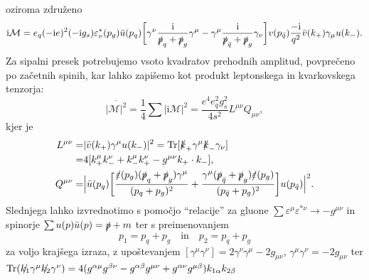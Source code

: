 \documentclass[11pt]{article}
\newcommand{\Tr}{\mathop{\rm Tr}\nolimits}
\newcommand{\ii}{\mathrm{i}}
\newcommand{\q}[1]{``#1''}
\begin{document}
oziroma združeno
\begin{equation}
       \ii \mathcal{M} = e_q (-\ii e)^2 (-\ii g_s )\varepsilon^*_\nu (p_g)
       \bar{u}(p_q)
       \bigg[ \gamma ^\nu \frac{\ii}{\slashed{p}_q + \slashed{p}_g} \gamma^\mu - 
       \gamma^\mu \frac{\ii}{\slashed{p}_{\bar{q}} + \slashed{p}_g} \gamma_\nu \bigg]
       v(p_{\bar{q}}) \frac{-\ii}{q^2} \bar{v}(k_+) \gamma_\mu u(k_-).
\end{equation}
Za sipalni presek potrebujemo vsoto kvadratov prehodnih amplitud, povprečeno po začetnih spinih, kar lahko zapišemo kot
produkt leptonskega in kvarkovskega tenzorja:
\begin{equation}
       \overline{| \mathcal{M} |^2} = \frac{1}{4} \sum | \ii \mathcal{M}|^2 = 
       \frac{e^4 e_q^2 g_s^2}{4 s^2} L^{\mu \nu} Q_{\mu \nu},
\end{equation}
kjer je
\begin{equation}
       \begin{split}
              L^{\mu \nu} =& | \bar{v}(k_+) \gamma^\mu u(k_-) |^2 = \Tr [\slashed{k}_+ \gamma^\mu \slashed{k}_- \gamma_\nu] \\
              =& 4 [k_+^\mu k_-^\nu + k_-^\mu k_+^\nu - g^{\mu \nu}k_+ \cdot k_-], \\
              Q^{\mu \nu} =& \Big | \bar{u}(p_q) \bigg [ 
                     \frac{\slashed{\varepsilon} (p_g) (\slashed{p}_{q} + \slashed{p}_g) \gamma^\mu}{(p_{q} + p_g)^2} + 
                     \frac{\gamma^\mu (\slashed{p}_{\bar{q}} + \slashed{p}_g) \slashed{\varepsilon} (p_g)}{(p_{\bar{q}} + p_g)^2}
              \bigg ] u(p_{\bar{q}}) \Big |^2.
       \end{split}
\end{equation}
Slednjega lahko izvrednotimo s pomočjo \q{relacije} za gluone $\sum \varepsilon^\mu \varepsilon^{* \nu} \rightarrow -g^{\mu \nu}$
in spinorje $\sum u(p) \bar{u}(p) = \slashed{p} + m$ ter s preimenovanjem
\begin{equation}
       p_1 = p_q + p_g \quad \text{in} \quad p_2 = p_{\bar{q}} + p_g
\end{equation}
za voljo krajšega izraza, z upoštevanjem
$[\gamma^\mu \gamma^\nu] = 2 \gamma^\nu \gamma^\mu - 2 g_{\mu \nu}$, \hspace*{5mm}  
 ${\gamma^\mu \gamma^\nu} = - 2 g_{\mu \nu}$ ter \newline
 $ \text{Tr}(\slashed{k_1} \gamma^\mu \slashed{k_2} \gamma^\nu) = 
 4(g^{\alpha\mu} g^{\beta\nu} - g^{\alpha\beta} g^{\mu\nu} + 
 g^{\alpha\nu} g^{\mu\beta}) k_{1\alpha} k_{2\beta}$
\end{document}
